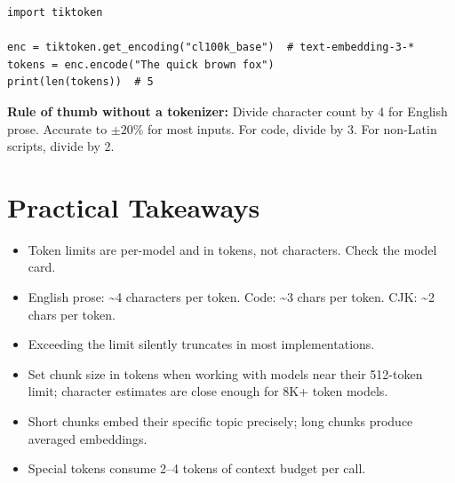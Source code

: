 \begin{Verbatim}
import tiktoken

enc = tiktoken.get_encoding("cl100k_base")  # text-embedding-3-*
tokens = enc.encode("The quick brown fox")
print(len(tokens))  # 5
\end{Verbatim}

\textbf{Rule of thumb without a tokenizer:}
Divide character count by 4 for English prose. Accurate to $\pm 20\%$ for most inputs.
For code, divide by 3. For non-Latin scripts, divide by 2.

\section{Practical Takeaways}

\begin{itemize}
    \item Token limits are per-model and in tokens, not characters. Check the model card.
    \item English prose: \textasciitilde4 characters per token. Code: \textasciitilde3 chars per token. CJK: \textasciitilde2 chars per token.
    \item Exceeding the limit silently truncates in most implementations.
    \item Set chunk size in tokens when working with models near their 512-token limit;
          character estimates are close enough for 8K+ token models.
    \item Short chunks embed their specific topic precisely; long chunks produce averaged embeddings.
    \item Special tokens consume 2--4 tokens of context budget per call.
\end{itemize}
